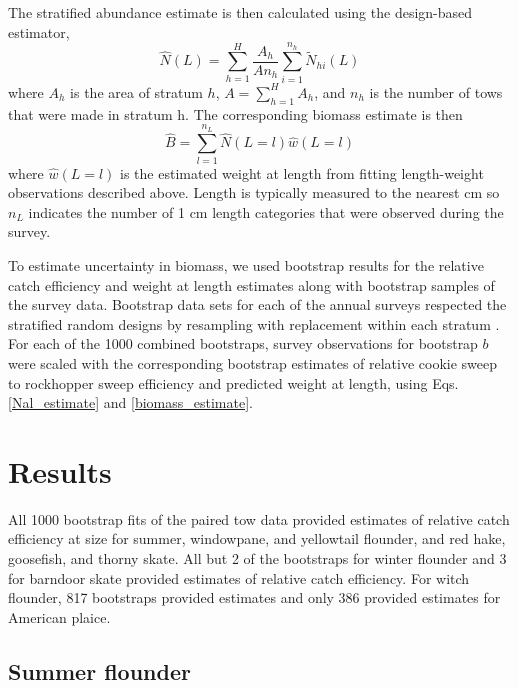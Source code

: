 \documentclass[]{article}
\begin{document}
The stratified abundance estimate is then calculated using the
design-based estimator, \begin{equation}\label{Nal_estimate}
 \widehat N(L) = \sum^H_{h=1} \frac{A_h}{An_h}\sum^{n_h}_{i=1} \widetilde N_{hi}(L)
\end{equation} where \(A_h\) is the area of stratum \(h\),
\(A=\sum^H_{h=1} A_h\), and \(n_h\) is the number of tows that were made
in stratum h. The corresponding biomass estimate is then
\begin{equation}\label{biomass_estimate}
 \widehat B = \sum^{n_L}_{l=1} \widehat N(L = l) \widehat w(L=l)
\end{equation} where \(\widehat w(L=l)\) is the estimated weight at
length from fitting length-weight observations described above. Length
is typically measured to the nearest cm so \(n_L\) indicates the number
of 1 cm length categories that were observed during the survey.

To estimate uncertainty in biomass, we used bootstrap results for the
relative catch efficiency and weight at length estimates along with
bootstrap samples of the survey data. Bootstrap data sets for each of
the annual surveys respected the stratified random designs by resampling
with replacement within each stratum \citep{smith97}. For each of the
1000 combined bootstraps, survey observations for bootstrap \(b\) were
scaled with the corresponding bootstrap estimates of relative cookie
sweep to rockhopper sweep efficiency and predicted weight at length,
using Eqs. \ref{Nal_estimate} and \ref{biomass_estimate}.

\hypertarget{results}{%
\section{Results}\label{results}}

All 1000 bootstrap fits of the paired tow data provided estimates of
relative catch efficiency at size for summer, windowpane, and yellowtail
flounder, and red hake, goosefish, and thorny skate. All but 2 of the
bootstraps for winter flounder and 3 for barndoor skate provided
estimates of relative catch efficiency. For witch flounder, 817
bootstraps provided estimates and only 386 provided estimates for
American plaice.

\hypertarget{summer-flounder}{%
\subsection{Summer flounder}\label{summer-flounder}}
\end{document}
